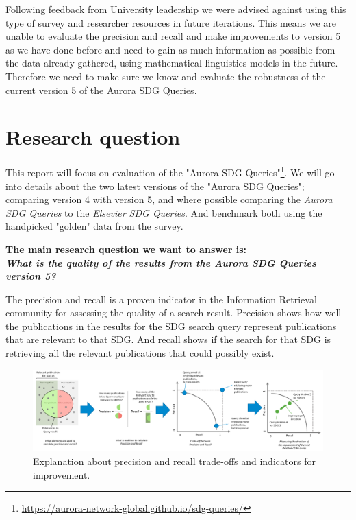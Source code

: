 \documentclass{article}
\begin{document}
Following feedback from University leadership we were advised against using this type of survey and researcher resources in future iterations. This means we are unable to evaluate the precision and recall and make improvements to version 5 as we have done before and need to gain as much information as possible from the data already gathered, using mathematical linguistics models in the future. Therefore we need to make sure we know and evaluate the robustness of the current version 5 of the Aurora SDG Queries.

\section{Research question}
\label{sec:research-question}

This report will focus on evaluation of the "Aurora SDG Queries"\footnote{\url{https://aurora-network-global.github.io/sdg-queries/} }. We will go into details about the two latest versions of the "Aurora SDG Queries"; comparing version 4 with version 5, and where possible comparing the \emph{Aurora SDG Queries} to the \emph{Elsevier SDG Queries}. And benchmark both using the handpicked "golden" data from the survey. 

\textbf{The main research question we want to answer is:  \\
\emph{What is the quality of the results from the Aurora SDG Queries version 5?}}

The precision and recall is a proven indicator in the Information Retrieval community for assessing the quality of a search result. Precision shows how well the publications in the results for the SDG search query represent publications that are relevant to that SDG. And recall shows if the search for that SDG is retrieving all the relevant publications that could possibly exist.

\begin{figure}[ht]
	\centering
  \includegraphics[width=1.0\textwidth]{figures/recall-precision.png}
	\caption{Explanation about precision and recall trade-offs and indicators for improvement.}
	\label{precisonandrecallexplanation}
\end{figure}
\end{document}
